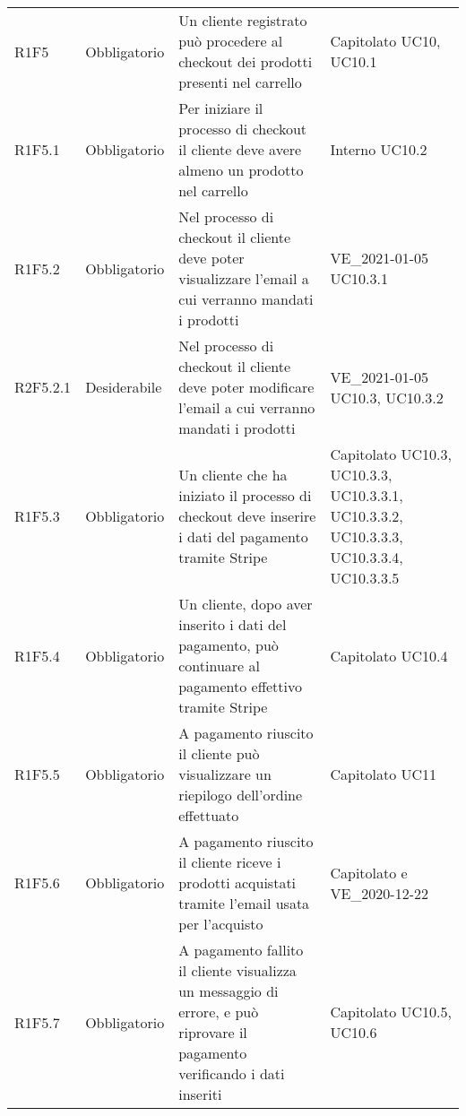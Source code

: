 {\begin{longtable}{C{2.5cm} C{2.8cm} C{6.7cm} C{2.5cm}}
R1F5 & Obbligatorio & Un cliente registrato può procedere al checkout dei prodotti presenti nel carrello & Capitolato \newline UC10, UC10.1\\
R1F5.1 & Obbligatorio & Per iniziare il processo di checkout il cliente deve avere almeno un prodotto nel carrello & Interno \newline UC10.2\\
R1F5.2 & Obbligatorio & Nel processo di checkout il cliente deve poter visualizzare l'email a cui verranno mandati i prodotti & VE\_2021-01-05 \newline UC10.3.1 \\
R2F5.2.1 & Desiderabile & Nel processo di checkout il cliente deve poter modificare l'email a cui verranno mandati i prodotti & VE\_2021-01-05 \newline UC10.3, UC10.3.2 \\
R1F5.3 & Obbligatorio & Un cliente che ha iniziato il processo di checkout deve inserire i dati del pagamento tramite Stripe & Capitolato \newline UC10.3, UC10.3.3, UC10.3.3.1, UC10.3.3.2, UC10.3.3.3, UC10.3.3.4, UC10.3.3.5\\
R1F5.4 & Obbligatorio & Un cliente, dopo aver inserito i dati del pagamento, può continuare al pagamento effettivo tramite Stripe & Capitolato \newline UC10.4\\
R1F5.5 & Obbligatorio & A pagamento riuscito il cliente può visualizzare un riepilogo dell'ordine effettuato & Capitolato \newline UC11\\
R1F5.6 & Obbligatorio & A pagamento riuscito il cliente riceve i prodotti acquistati tramite l'email usata per l'acquisto & Capitolato e VE\_2020-12-22 \\
R1F5.7 & Obbligatorio & A pagamento fallito il cliente visualizza un messaggio di errore, e può riprovare il pagamento verificando i dati inseriti & Capitolato \newline UC10.5, UC10.6\\



\end{longtable}}
